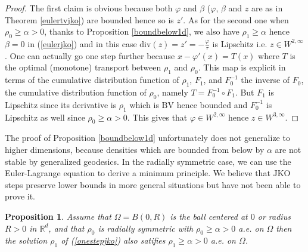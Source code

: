 \documentclass[12pt, a4paper]{article}
\numberwithin{equation}{section}
\theoremstyle{plain}
\newtheorem{prop}[thm]{Proposition}
\theoremstyle{definition}
\theoremstyle{remark}
\newcommand{\R}{\mathbb{R}}
\newcommand{\BV}{\mathrm{BV}}
\newcommand{\dive}{\mathrm{div}}
\newcommand\pref[1]{(\ref{#1})}
\begin{document}
\begin{proof}
The first claim is obvious because both $\varphi$ and $\beta$ ($\varphi$, $\beta$ and $z$ are as in Theorem \ref{eulertvjko}) are bounded hence so is $z'$. As for the second one when $\rho_0\ge \alpha>0$, thanks to Proposition \ref{boundbelow1d}, we also have $\rho_1\ge \alpha$ hence $\beta=0$ in \pref{eulerjko} and in this case $\dive(z)=z'=-\frac{\varphi}{\tau}$ is Lipschitz i.e. $z\in W^{2, \infty}$. One can actually go one step further because $x-\varphi'(x)=T(x)$ where $T$ is the optimal (monotone) transport between $\rho_1$ and $\rho_0$. This map is explicit in terms of the cumulative distribution function of $\rho_1$, $F_1$, and $F_0^{-1}$ the inverse of $F_0$, the cumulative distribution function of $\rho_0$, namely $T=F_0^{-1} \circ F_1$. But $F_1$ is Lipschitz since its derivative is $\rho_1$ which is $\BV$ hence bounded and $F_0^{-1}$ is Lipschitz as well since $\rho_0\ge \alpha>0$. This gives that $\varphi \in W^{2, \infty}$ hence  $z\in W^{3, \infty}$.
\end{proof}
 
 

 
 
 
 
 The proof of  Proposition \ref{boundbelow1d} unfortunately does not generalize to higher dimensions, because densities which are bounded from below by $\alpha$ are not stable by generalized geodesics. In the radially symmetric case, we can use the Euler-Lagrange equation to derive a minimum principle. We believe that JKO steps preserve lower bounds in more general situations but have not been able to prove it.
 
 
  \begin{prop}\label{boundbelowradial}
 Assume that  $\Omega=B(0,R)$ is the ball centered at $0$  or radius $R>0$ in $\R^d$, and that  $\rho_0$ is radially symmetric with $\rho_0 \ge \alpha >0$ a.e. on $\Omega$ then the solution $\rho_1$ of \pref{onestepjko} also satifies $\rho_1 \ge \alpha >0$ a.e. on $\Omega$. 
 
 \end{prop}
 
\end{document}

